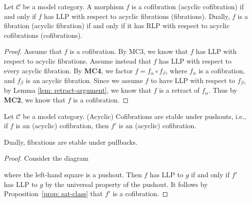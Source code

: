 \documentclass[../thesis.tex]{subfiles}
\begin{document}
            \begin{proposition}\label{prop: sat-class}
                Let $\mathcal{C}$ be a model category. A morphism $f$ is a cofibration (acyclic cofibration) if and only if $f$ has LLP with respect to acyclic fibrations (fibrations). Dually, $f$ is a fibration (acyclic fibration) if and only if it has RLP with respect to acyclic cofibrations (cofibrations).
            \end{proposition}

            \begin{proof}
            Assume that $f$ is a cofibration. By MC3, we know that $f$ has LLP with respect to acyclic fibrations. Assume instead that $f$ has LLP with respect to every acyclic fibration. By \textbf{MC4}, we factor $f = f_\alpha\circ f_\beta$, where $f_\alpha$ is a cofibration, and $f_\beta$ is an acyclic fibration. Since we assume $f$ to have LLP with respect to $f_\beta$, by Lemma \ref{lem: retract-argument}, we know that $f$ is a retract of $f_\alpha$. Thus by \textbf{MC2}, we know that $f$ is a cofibration. 
            \end{proof}

            \begin{corollary}\label{cor: stable-cofib-base-change}
                Let $\mathcal{C}$ be a model category. (Acyclic) Cofibrations are stable under pushouts, i.e., if $f$ is an (acyclic) cofibration, then $f'$ is an (acyclic) cofibration.
                \begin{center}
                \end{center}
                Dually, fibrations are stable under pullbacks.
            \end{corollary}

            \begin{proof}
                Consider the diagram
                \begin{center}
                \end{center}
                where the left-hand square is a pushout. Then $f$ has LLP to $g$ if and only if $f'$ has LLP to $g$ by the universal property of the pushout. It follows by Proposition~\ref{prop: sat-class} that $f'$ is a cofibration.
            \end{proof}
\end{document}
